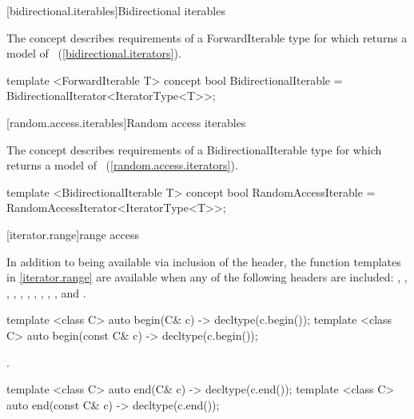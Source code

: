 \begin{addedblock}
[bidirectional.iterables]{Bidirectional iterables}

\pnum
The  concept describes requirements of a
ForwardIterable type for which  returns a model of
~(\ref{bidirectional.iterators}).

\begin{codeblock}
template <ForwardIterable T>
concept bool BidirectionalIterable =
  BidirectionalIterator<IteratorType<T>>;
\end{codeblock}

[random.access.iterables]{Random access iterables}

\pnum
The  concept describes requirements of a
BidirectionalIterable type for which  returns a model of
~(\ref{random.access.iterators}).

\begin{codeblock}
template <BidirectionalIterable T>
concept bool RandomAccessIterable =
  RandomAccessIterator<IteratorType<T>>;
\end{codeblock}

\end{addedblock}

[iterator.range]{range access}

\pnum
In addition to being available via inclusion of the  header,
the function templates in \ref{iterator.range} are available when any of the following
headers are included: , , ,
, , , , ,
, , and .

%
\begin{itemdecl}
template <class C> auto begin(C& c) -> decltype(c.begin());
template <class C> auto begin(const C& c) -> decltype(c.begin());
\end{itemdecl}

\begin{itemdescr}
\pnum
\returns {}.
\end{itemdescr}

%
\begin{itemdecl}
template <class C> auto end(C& c) -> decltype(c.end());
template <class C> auto end(const C& c) -> decltype(c.end());
\end{itemdecl}

